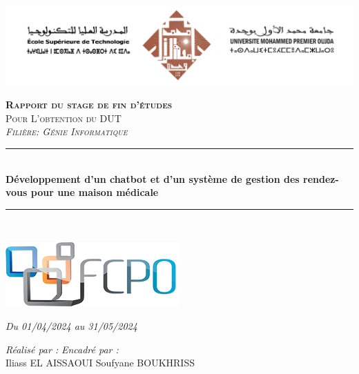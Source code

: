 
\thispagestyle{empty}
\hspace{0.4cm}  
\includegraphics[scale=0.40]{Logos/test.png} 
        
\vspace{-0.2cm}
\begin{center}
{\large \textsc{\textbf{Rapport du stage de fin d'études}}}\\[0.1cm]
{\large \textsc{Pour L'obtention du DUT}}\\[0.1cm]
{\large \textsc{\textit{Filière: Génie Informatique}}} \\[0.05cm] 
\vspace{-0.04cm}
\rule{\linewidth}{0.3mm} \\[0.4cm]   %
 { \huge \textbf{ Développement d'un chatbot et d'un système de gestion des rendez-vous pour une maison médicale }} \\[0.15cm] 
\rule{\linewidth}{0.3mm} \\[0.4cm]
\vspace{0.4cm}

\includegraphics[scale=0.475]{Logos/fcpo.png}  %

\vspace{0.3cm}

{\large \textit{Du 01/04/2024 au 31/05/2024 }}\\[0.5cm]

\vspace{1cm}

\noindent
\begin{minipage}{0.9\textwidth}
    \vspace{-7mm}
  \begin{flushleft} \large
    \emph{Réalisé par :} \hspace{8.1cm} \emph{Encadré par :} \\
    Iliass \textsc{EL AISSAOUI} \hspace{6.2cm} Soufyane \textsc{BOUKHRISS} %
  \end{flushleft}
\end{minipage}
\begin{minipage}{0.4\textwidth}


\end{minipage}
\end{center}
